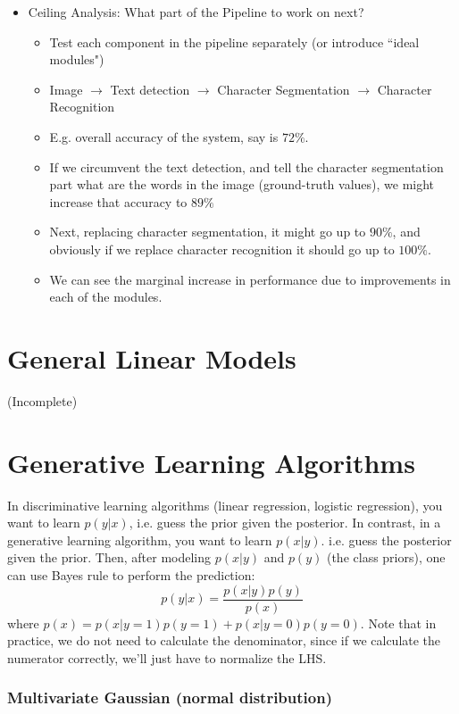\documentclass[letterpaper,10pt]{article}
\begin{document}
\begin{itemize}
\item Ceiling Analysis: What part of the Pipeline to work on next?
	\begin{itemize}
	\item Test each component in the pipeline separately (or introduce ``ideal modules")
	\item Image $\rightarrow$ Text detection $\rightarrow$ Character Segmentation $\rightarrow$ Character Recognition
	\item E.g. overall accuracy of the system, say is $72\%$.
	\item If we circumvent the text detection, and tell the character segmentation part what are the words in the image (ground-truth values), we might increase that accuracy to $89\%$
	\item Next, replacing character segmentation, it might go up to $90\%$, and obviously if we replace character recognition it should go up to $100\%$.
	\item We can see the marginal increase in performance due to improvements in each of the modules.
	\end{itemize}
\end{itemize}


\section{General Linear Models}

(Incomplete)

\section{Generative Learning Algorithms}

In discriminative learning algorithms (linear regression, logistic regression), you want to learn $p(y|x)$, i.e. guess the prior given the posterior. In contrast, in a generative learning algorithm, you want to learn $p(x|y)$. i.e. guess the posterior given the prior. Then, after modeling $p(x|y)$ and $p(y)$ (the class priors), one can use Bayes rule to perform the prediction:
\begin{equation}
p(y|x) = \frac{p(x|y) p(y)}{p(x)}
\end{equation}
where $p(x) = p(x|y=1)p(y=1) + p(x|y=0)p(y=0)$. Note that in practice, we do not need to calculate the denominator, since if we calculate the numerator correctly, we'll just have to normalize the LHS.

\subsubsection{Multivariate Gaussian (normal distribution)}
\end{document}

